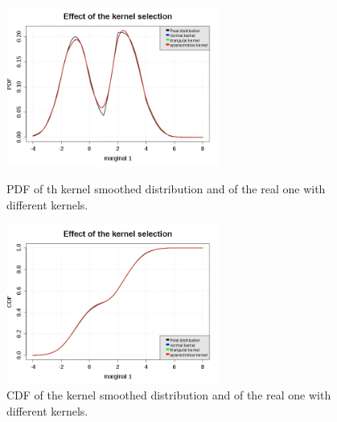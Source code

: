 \begin{figure}[H]
  \begin{minipage}{7cm}
    \begin{center}
      \includegraphics[width=7cm]{kernelSmoothing_pdf.png}
      \caption{PDF of th kernel smoothed distribution and of the real one with different kernels.}
      \label{pdf_KernelSmooth}
    \end{center}
  \end{minipage}
  \hfill
  \begin{minipage}{7cm}
    \begin{center}
      \includegraphics[width=7cm]{kernelSmoothing_cdf.png}
      \caption{CDF of the kernel smoothed distribution and of the real one with different kernels.}
      \label{cdf_KernelSmooth}
    \end{center}
  \end{minipage}
\end{figure}



